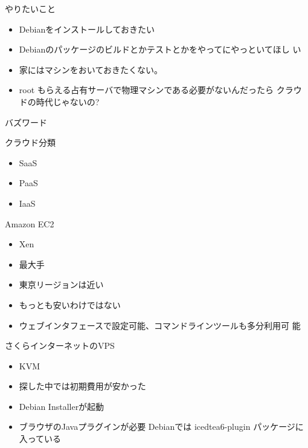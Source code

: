 \begin{frame}{やりたいこと}

\begin{itemize}
 \item Debianをインストールしておきたい
 \item Debianのパッケージのビルドとかテストとかをやってにやっといてほし
       い
 \item 家にはマシンをおいておきたくない。
 \item root もらえる占有サーバで物理マシンである必要がないんだったら
       クラウドの時代じゃないの?
\end{itemize}
 
\end{frame}

\begin{frame}{バズワード}

クラウド分類
 
\begin{itemize}
 \item SaaS
 \item PaaS
 \item IaaS
\end{itemize}
\end{frame}

\begin{frame}{Amazon EC2}

\begin{itemize}
 \item Xen
 \item 最大手
 \item 東京リージョンは近い
 \item もっとも安いわけではない
 \item ウェブインタフェースで設定可能、コマンドラインツールも多分利用可
       能
\end{itemize}
 
\end{frame}

\begin{frame}{さくらインターネットのVPS}

\begin{itemize}
 \item KVM
 \item 探した中では初期費用が安かった
 \item Debian Installerが起動
 \item ブラウザのJavaプラグインが必要
       Debianでは icedtea6-plugin パッケージに入っている
\end{itemize}

\end{frame}

